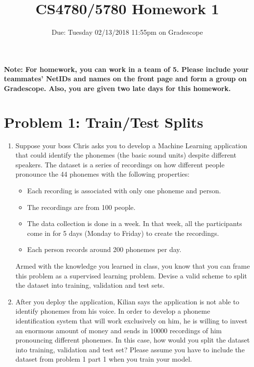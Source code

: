 \documentclass[11pt]{article}
\title{CS4780/5780 Homework 1}
\author{Due: Tuesday 02/13/2018 11:55pm on Gradescope}
\date{}
\begin{document}
	\maketitle
	\noindent
	\textbf{Note: For homework, you can work in a team of 5. Please include your teammates' NetIDs and names on the front page and form a group on Gradescope. Also, you are given two late days for this homework.}
	\section*{Problem 1: Train/Test Splits}
	\begin{enumerate}
		\item Suppose your boss Chris asks you to develop a Machine Learning application that could identify the phonemes (the basic sound units) despite different speakers. The dataset is a series of recordings on how different people pronounce the 44 phonemes with the following properties:
		\begin{itemize}
			\item Each recording is associated with only one phoneme and person.
			\item The recordings are from 100 people.
			\item The data collection is done in a week. In that week, all the participants come in for 5 days (Monday to Friday) to create the recordings.
			\item Each person records around 200 phonemes per day. 
		\end{itemize}
		Armed with the knowledge you learned in class, you know that you can frame this problem as a supervised learning problem. Devise a valid scheme to split the dataset into training, validation and test sets. 
		\item After you deploy the application, Kilian says the application is not able to identify phonemes from his voice. In order to develop a phoneme identification system that will work exclusively on him, he is willing to invest an enormous amount of money and sends in 10000 recordings of him pronouncing different phonemes. In this case, how would you split the dataset into training, validation and test set? Please assume you have to include the dataset from problem 1 part 1 when you train your model.
	\end{enumerate}
	
\end{document}
